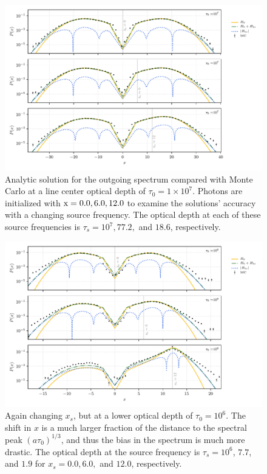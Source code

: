\documentclass{aastex63}
\begin{document}
 \begin{figure}
    \centering
    \includegraphics{xinit_threepanel.pdf}
    \caption{Analytic solution for the outgoing spectrum compared with Monte Carlo at a line center optical depth of $\tau_0 = 1 \times 10^7$. Photons are initialized with $\rm x = 0.0, 6.0, 12.0$ to examine the solutions' accuracy with a changing source frequency. The optical depth at each of these source frequencies is $\tau_s = 10^7, 77.2,$ and $18.6$, respectively.} 
    \label{fig:sol_mc_xinit}
\end{figure}

 \begin{figure}
    \centering
    \includegraphics{xinit_threepanel_tau1e6.pdf}
    \caption{Again changing $x_s$, but at a lower optical depth of $\tau_0 = 10^6$. The shift in $x$ is a much larger fraction of the distance to the spectral peak $(a\tau_0)^{1/3}$, and thus the bias in the spectrum is much more drastic. The optical depth at the source frequency is $\tau_s = 10^6$, $7.7$, and $1.9$ for $x_s=0.0, 6.0,$ and $12.0$, respectively. } 
    \label{fig:sol_mc_xinit_lowtau}
\end{figure}
\end{document}
